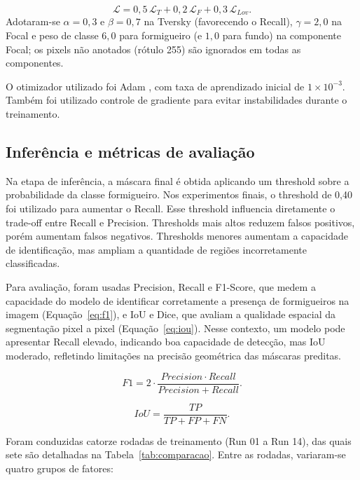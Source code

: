 \documentclass[10pt,a4paper,twocolumn]{article}
\begin{document}
\begin{equation}
\mathcal{L} = 0{,}5\,\mathcal{L}_{T} + 0{,}2\,\mathcal{L}_{F} + 0{,}3\,\mathcal{L}_{Lov}.
\label{eq:combined}
\end{equation}
Adotaram-se $\alpha = 0{,}3$ e $\beta = 0{,}7$ na Tversky (favorecendo o Recall), $\gamma = 2{,}0$ na Focal e peso de classe $6{,}0$ para formigueiro (e $1{,}0$ para fundo) na componente Focal; os pixels não anotados (rótulo 255) são ignorados em todas as componentes.

O otimizador utilizado foi Adam \cite{kingma2015}, com taxa de aprendizado inicial de $1 \times 10^{-3}$. Também foi utilizado controle de gradiente para evitar instabilidades durante o treinamento.

\subsection{Inferência e métricas de avaliação}

Na etapa de inferência, a máscara final é obtida aplicando um threshold sobre a probabilidade da classe formigueiro. Nos experimentos finais, o threshold de 0,40 foi utilizado para aumentar o Recall. Esse threshold influencia diretamente o trade-off entre Recall e Precision. Thresholds mais altos reduzem falsos positivos, porém aumentam falsos negativos. Thresholds menores aumentam a capacidade de identificação, mas ampliam a quantidade de regiões incorretamente classificadas.

Para avaliação, foram usadas Precision, Recall e F1-Score, que medem a capacidade do modelo de identificar corretamente a presença de formigueiros na imagem (Equação~\ref{eq:f1}), e IoU e Dice, que avaliam a qualidade espacial da segmentação pixel a pixel (Equação~\ref{eq:iou}). Nesse contexto, um modelo pode apresentar Recall elevado, indicando boa capacidade de detecção, mas IoU moderado, refletindo limitações na precisão geométrica das máscaras preditas.

\begin{equation}
F1 = 2 \cdot \frac{Precision \cdot Recall}{Precision + Recall}.
\label{eq:f1}
\end{equation}

\begin{equation}
IoU = \frac{TP}{TP + FP + FN}.
\label{eq:iou}
\end{equation}

Foram conduzidas catorze rodadas de treinamento (Run 01 a Run 14), das quais sete são detalhadas na Tabela~\ref{tab:comparacao}. Entre as rodadas, variaram-se quatro grupos de fatores:
\end{document}

